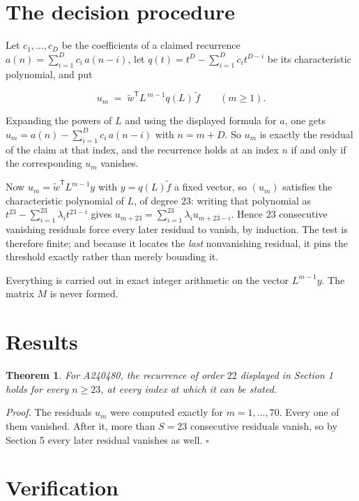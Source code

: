 \documentclass[11pt]{article}
\newtheorem{theorem}{Theorem}
\theoremstyle{definition}
\begin{document}
\section{The decision procedure}

Let $c_1,\dots,c_D$ be the coefficients of a claimed recurrence $a(n) = \sum_{i=1}^{D} c_i\,a(n-i)$, let $q(t) = t^{D} - \sum_{i=1}^{D} c_i t^{D-i}$ be its characteristic polynomial, and put

\[u_m \;=\; \tilde w^{\mathsf T} L^{\,m-1} q(L)\,\tilde f \qquad (m \ge 1).\]

Expanding the powers of $L$ and using the displayed formula for $a$, one gets $u_m = a(n) - \sum_{i=1}^{D} c_i\,a(n-i)$ with $n = m + D$. So $u_m$ is exactly the residual of the claim at that index, and the recurrence holds at an index $n$ if and only if the corresponding $u_m$ vanishes.

Now $u_m = \tilde w^{\mathsf T} L^{m-1} y$ with $y = q(L)\tilde f$ a fixed vector, so $(u_m)$ satisfies the characteristic polynomial of $L$, of degree $23$: writing that polynomial as $t^{23} - \sum_{i=1}^{23} \lambda_i t^{23-i}$ gives $u_{m+23} = \sum_{i=1}^{23} \lambda_i u_{m+23-i}$. Hence $23$ consecutive vanishing residuals force every later residual to vanish, by induction. The test is therefore finite; and because it locates the {\itshape last} nonvanishing residual, it pins the threshold exactly rather than merely bounding it.

Everything is carried out in exact integer arithmetic on the vector $L^{m-1}y$. The matrix $M$ is never formed.

\section{Results}

\begin{theorem} For A240480, the recurrence of order $22$ displayed in Section 1 holds for every $n \ge 23$, at every index at which it can be stated.\end{theorem}

{\itshape Proof.} The residuals $u_m$ were computed exactly for $m = 1,\dots,70$. Every one of them vanished. After it, more than $S = 23$ consecutive residuals vanish, so by Section 5 every later residual vanishes as well. $\square$

\section{Verification}
\end{document}
